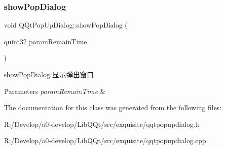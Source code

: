 \subsubsection{\texorpdfstring{show\+Pop\+Dialog}{showPopDialog}}
{\footnotesize\ttfamily void Q\+Qt\+Pop\+Up\+Dialog\+::show\+Pop\+Dialog (\begin{DoxyParamCaption}\item[{quint32}]{param\+Remain\+Time = {} }\end{DoxyParamCaption})\hspace{0.3cm}{\ttfamily [slot]}}



show\+Pop\+Dialog 显示弹出窗口 


\begin{DoxyParams}{Parameters}
{\em param\+Remain\+Time} & \\
\hline
\end{DoxyParams}


The documentation for this class was generated from the following files\+:\begin{DoxyCompactItemize}
\item 
R\+:/\+Develop/a0-\/develop/\+Lib\+Q\+Qt/src/exquisite/qqtpopupdialog.\+h\item 
R\+:/\+Develop/a0-\/develop/\+Lib\+Q\+Qt/src/exquisite/qqtpopupdialog.\+cpp\end{DoxyCompactItemize}
